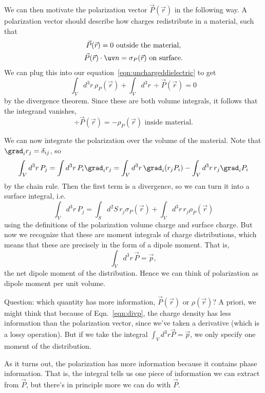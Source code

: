 We can then motivate the polarization vector $\vec P(\vec r)$ in the following way. A polarization vector should describe how charges redistribute in a material, such that
\begin{gather}
    \vec P(\vec r) = 0 \text{ outside the material},\\
    \vec P(\vec r) \cdot \uv n = \sigma_P(\vec r) \text{ on surface}.
\end{gather}
We can plug this into our equation~\eqref{eqn:unchargeddielectric} to get
\begin{equation}
    \int_V d^3 r\, \rho_P(\vec r) + \int_V d^3r\, \div \vec P(\vec r) =0
\end{equation}
by the divergence theorem. Since these are both volume integrals, it follows that the integrand vanishes,
\begin{equation}\label{eqn:divp}
    \div \vec P(\vec r) = -\rho_P(\vec r) \text{ inside material.}
\end{equation}

We can now integrate the polarization over the volume of the material. Note that $\grad_i r_j= \delta_{ij}$, so
\begin{equation}
    \int_V d^3 r\, P_j  = \int d^3r\, P_i \grad_i r_j = \int_V d^3r\, \grad_i(r_j P_i) - \int_V d^3r \, r_j \grad_i P_i
\end{equation}
by the chain rule. Then the first term is a divergence, so we can turn it into a surface integral, i.e.
\begin{equation}
    \int_V d^3r\, P_j = \int_S d^2 S\, r_j \sigma_P(\vec r) + \int_V d^3 r \, r_j \rho_P(\vec r)
\end{equation}
using the definitions of the polarization volume charge and surface charge. But now we recognize that these are moment integrals of charge distributions, which means that these are precisely in the form of a dipole moment. That is,
\begin{equation}
    \int_V d^3r \,\vec P = \vec p,
\end{equation}
the net dipole moment of the distribution. Hence we can think of polarization as dipole moment per unit volume.

Question: which quantity has more information, $\vec P(\vec r)$ or $\rho(\vec r)$? A priori, we might think that because of Eqn.~\eqref{eqn:divp}, the charge density has less information than the polarization vector, since we've taken a derivative (which is a lossy operation). But if we take the integral $\int_V d^3r \vec P = \vec p$, we only specify one moment of the distribution.

As it turns out, the polarization has more information because it contains phase information. That is, the integral tells us one piece of information we can extract from $\vec P$, but there's in principle more we can do with $\vec P$.
